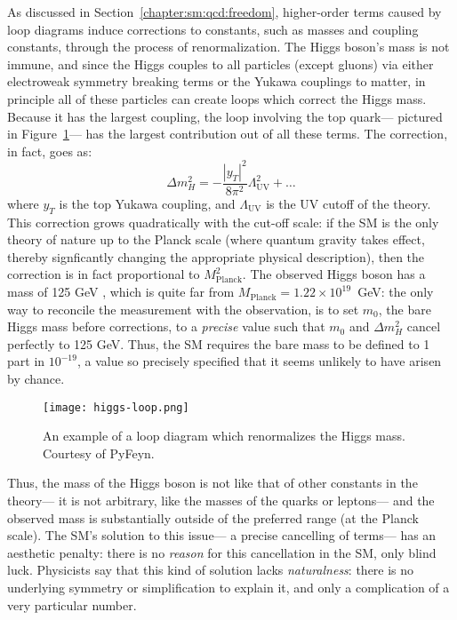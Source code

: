 As discussed in Section~\ref{chapter:sm:qcd:freedom}, higher-order terms caused by loop diagrams induce corrections to constants, such as masses and coupling constants, through the process of renormalization. The Higgs boson's mass is not immune, and since the Higgs couples to all particles (except gluons) via either electroweak symmetry breaking terms or the Yukawa couplings to matter, in principle all of these particles can create loops which correct the Higgs mass. Because it has the largest coupling, the loop involving the top quark--- pictured in Figure~\ref{fig:susy:higgs-loop}---  has the largest contribution out of all these terms.  The correction, in fact, goes as:
%
\begin{equation}
\Delta m_H^2 = - \frac{|y_T|^2}{8\pi^2}\Lambda_\mathrm{UV}^2 + \ldots
\end{equation}
%
where $y_T$ is the top Yukawa coupling, and $\Lambda_\mathrm{UV}$ is the UV cutoff of the theory. This correction grows quadratically with the cut-off scale: if the SM is the only theory of nature up to the Planck scale (where quantum gravity takes effect, thereby signficantly changing the appropriate physical description), then the correction is in fact proportional to $M_\mathrm{Planck}^2$. The observed Higgs boson has a mass of 125 GeV , which is quite far from $M_\mathrm{Planck} = 1.22\times 10^{19}$~GeV: the only way to reconcile the measurement with the observation, is to set $m_0$, the bare Higgs mass before corrections, to a \textit{precise} value such that $m_0$ and $\Delta m_H^2$ cancel perfectly to 125 GeV. Thus, the SM requires the bare mass to be  defined to 1 part in $10^{-19}$, a value so precisely specified that it seems unlikely to have arisen by chance. 


\begin{figure}
\centering
\texttt{[image: higgs-loop.png]}
\label{fig:susy:higgs-loop}
\caption{An example of a loop diagram which renormalizes the Higgs mass. Courtesy of PyFeyn.}
\end{figure}


Thus, the mass of the Higgs boson is not like that of other constants in the theory--- it is not arbitrary, like the masses of the quarks or leptons--- and the observed mass is substantially outside of the preferred range (at the Planck scale).  The SM's solution to this issue--- a precise cancelling of terms--- has an aesthetic penalty: there is no \textit{reason} for this cancellation in the SM, only blind luck. Physicists say that this kind of solution lacks \textit{naturalness}: there is no underlying symmetry or simplification to explain it, and only a complication of a very particular number.



